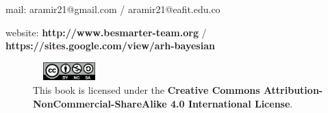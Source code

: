 mail: aramir21@gmail.com / aramir21@eafit.edu.co

website: \textbf{http://www.besmarter-team.org} / \textbf{https://sites.google.com/view/arh-bayesian}

\begin{figure}[h]
	\includegraphics[width=80pt, height=20pt]{frontmatter/figures/by-nc-sa.png}
	\caption[List of figure caption goes here]{This book is licensed under the \textbf{Creative Commons Attribution-NonCommercial-ShareAlike 4.0 International License}.}\label{fig02}
\end{figure}




